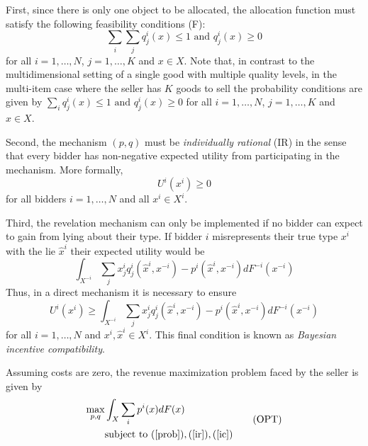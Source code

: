 First, since there is only one object to be allocated, the allocation function must satisfy the following feasibility conditions (F):
\begin{equation}\label{prob}
    \sum_i \sum_j q_j^i(x) \leq 1 \text{ and } q_j^i(x) \geq 0 \tag{F}
\end{equation}
\noindent for all $i=1,\dots,N$, $j=1,\dots,K$ and $x \in X$. Note that, in contrast to the multidimensional setting of a single good with multiple quality levels, in the multi-item case where the seller has $K$ goods to sell the probability conditions are given by $\sum_i q_j^i(x) \leq 1 \text{ and } q_j^i(x) \geq 0$ for all $i=1,\dots,N$, $j=1,\dots,K$ and $x \in X$.

Second, the mechanism $(p,q)$ must be \textit{individually rational} (IR) in the sense that every bidder has non-negative expected utility from participating in the mechanism. More formally,
\begin{equation}\label{ir}
    U^i(x^i) \geq 0 \tag{IR}
\end{equation}
\noindent for all bidders $i=1,\dots,N$ and all $x^i \in X^i$.

Third, the revelation mechanism can only be implemented if no bidder can expect to gain from lying about their type. If bidder $i$ misrepresents their true type $x^i$ with the lie $\widehat{x}^i$ their expected utility would be
\begin{equation}
    \int_{X^{-i}} \sum_j x_j^i q_j^i(\widehat{x}^i,x^{-i}) - p^i(\widehat{x}^i,x^{-i}) dF^{-i}(x^{-i})
\end{equation}
\noindent Thus, in a direct mechanism it is necessary to ensure
\begin{equation}\label{ic}
    U^i(x^i) \geq \int_{X^{-i}} \sum_j x_j^i q_j^i(\widehat{x}^i,x^{-i}) - p^i(\widehat{x}^i,x^{-i}) dF^{-i}(x^{-i}) \tag{IC}
\end{equation}
\noindent for all $i=1,\dots,N$ and $x^i, \widehat{x}^i \in X^i$. This final condition is known as \textit{Bayesian incentive compatibility}.

Assuming costs are zero, the revenue maximization problem faced by the seller is given by
\begin{equation}
\begin{aligned}\label{eq_opt}
    \max_{p,q} &\int_X \sum_i p^i(x) dF(x) \\
    &\text{subject to } (\ref{prob}), (\ref{ir}), (\ref{ic})
\end{aligned}  \tag{OPT} 
\end{equation}

